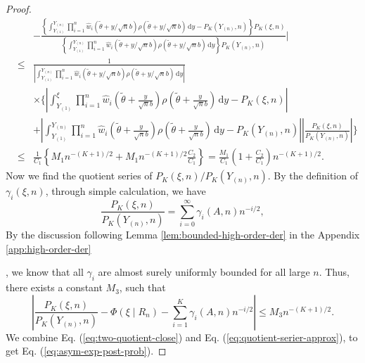 \documentclass[oneside,english]{amsbook}
\numberwithin{section}{chapter}
\numberwithin{equation}{section}
\numberwithin{figure}{section}
\theoremstyle{plain}
\theoremstyle{plain}
\theoremstyle{definition}
\theoremstyle{plain}
\theoremstyle{plain}
\theoremstyle{remark}
\theoremstyle{definition}
\theoremstyle{definition}
\newcommand{\diff}{\,\mathrm{d}}
\begin{document}
\begin{proof}
\begin{eqnarray}
 &  & -\frac{\left\{ \int_{Y_{\left(1\right)}}^{Y_{\left(n\right)}}\prod_{i=1}^{n}\hat{w}_{i}\left(\tilde{\theta}+y/\sqrt{n}b\right)\rho\left(\tilde{\theta}+y/\sqrt{n}b\right)\diff y-P_{K}\left(Y_{\left(n\right)},n\right)\right\} P_{K}\left(\xi,n\right)}{\left\{ \int_{Y_{\left(1\right)}}^{Y_{\left(n\right)}}\prod_{i=1}^{n}\hat{w}_{i}\left(\tilde{\theta}+y/\sqrt{n}b\right)\rho\left(\tilde{\theta}+y/\sqrt{n}b\right)\diff y\right\} P_{K}\left(Y_{\left(n\right)},n\right)}\Bigg|\nonumber \\
 & \le & \frac{1}{\left|\int_{Y_{\left(1\right)}}^{Y_{\left(n\right)}}\prod_{i=1}^{n}\hat{w}_{i}\left(\tilde{\theta}+y/\sqrt{n}b\right)\rho\left(\tilde{\theta}+y/\sqrt{n}b\right)\diff y\right|}\\
 && \times\Bigg\{\left|\int_{Y_{\left(1\right)}}^{\xi}\prod_{i=1}^{n}\hat{w}_{i}\left(\tilde{\theta}+\frac{y}{\sqrt{n}b}\right)\rho\left(\tilde{\theta}+\frac{y}{\sqrt{n}b}\right)\diff y-P_{K}\left(\xi,n\right)\right|\\
 &  & +\left|\int_{Y_{\left(1\right)}}^{Y_{\left(n\right)}}\prod_{i=1}^{n}\hat{w}_{i}\left(\tilde{\theta}+\frac{y}{\sqrt{n}b}\right)\rho\left(\tilde{\theta}+\frac{y}{\sqrt{n}b}\right)\diff y-P_{K}\left(Y_{\left(n\right)},n\right)\right|\left|\frac{P_{K}\left(\xi,n\right)}{P_{K}\left(Y_{\left(n\right)},n\right)}\right|\Bigg\}\nonumber \\
 & \le & \frac{1}{C_{1}}\left\{ M_{1}n^{-\left(K+1\right)/2}+M_{1}n^{-\left(K+1\right)/2}\frac{C_{2}}{C_{1}}\right\} =\frac{M_{1}}{C_{1}}\left(1+\frac{C_{2}}{C_{1}}\right)n^{-\left(K+1\right)/2}.\label{eq:two-quotient-close}
\end{eqnarray}
Now we find the quotient series of $P_{K}\left(\xi,n\right)/P_{K}\left(Y_{\left(n\right)},n\right)$.
By the definition of $\gamma_{i}\left(\xi,n\right)$, through simple
calculation, we have 
\[
\frac{P_{K}\left(\xi,n\right)}{P_{K}\left(Y_{\left(n\right)},n\right)}=\sum_{i=0}^{\infty}\gamma_{i}\left(A,n\right)n^{-i/2},
\]
 By the discussion following Lemma \ref{lem:bounded-high-order-der} in the Appendix \ref{app:high-order-der} {},
we know that all $\gamma_{i}$ are almost surely uniformly bounded
for all large $n$. Thus, there exists a constant $M_{3}$, such that
\begin{equation}
\left|\frac{P_{K}\left(\xi,n\right)}{P_{K}\left(Y_{\left(n\right)},n\right)}-\Phi\left(\xi\mid R_{n}\right)-\sum_{i=1}^{K}\gamma_{i}\left(A,n\right)n^{-i/2}\right|\le M_{3}n^{-\left(K+1\right)/2}.\label{eq:quotient-serier-approx}
\end{equation}
We combine Eq. (\ref{eq:two-quotient-close}) and Eq. (\ref{eq:quotient-serier-approx}),
to get Eq. (\ref{eq:asym-exp-post-prob}).
\end{proof}
\end{document}
